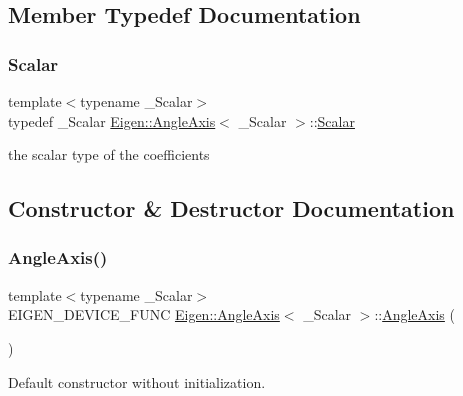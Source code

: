 \subsection{Member Typedef Documentation}
\mbox{\label{class_eigen_1_1_angle_axis_acd9b10692d7d726b28670e4d3a282fe8}} 
\subsubsection{\texorpdfstring{Scalar}{Scalar}}
{\footnotesize\ttfamily template$<$typename \+\_\+\+Scalar$>$ \\
typedef \+\_\+\+Scalar \mbox{\hyperlink{class_eigen_1_1_angle_axis}{Eigen\+::\+Angle\+Axis}}$<$ \+\_\+\+Scalar $>$\+::\mbox{\hyperlink{class_eigen_1_1_angle_axis_acd9b10692d7d726b28670e4d3a282fe8}{Scalar}}}

the scalar type of the coefficients 

\subsection{Constructor \& Destructor Documentation}
\mbox{\label{class_eigen_1_1_angle_axis_a400d37afcd998d1ee348d37b8bd13778}} 
\subsubsection{\texorpdfstring{AngleAxis()}{AngleAxis()}\hspace{0.1cm}{\footnotesize\ttfamily [1/5]}}
{\footnotesize\ttfamily template$<$typename \+\_\+\+Scalar$>$ \\
E\+I\+G\+E\+N\+\_\+\+D\+E\+V\+I\+C\+E\+\_\+\+F\+U\+NC \mbox{\hyperlink{class_eigen_1_1_angle_axis}{Eigen\+::\+Angle\+Axis}}$<$ \+\_\+\+Scalar $>$\+::\mbox{\hyperlink{class_eigen_1_1_angle_axis}{Angle\+Axis}} (\begin{DoxyParamCaption}{ }\end{DoxyParamCaption})\hspace{0.3cm}{\ttfamily [inline]}}

Default constructor without initialization. \mbox{\label{class_eigen_1_1_angle_axis_aabac8ee9d467696cddcca18f788a850d}} 
